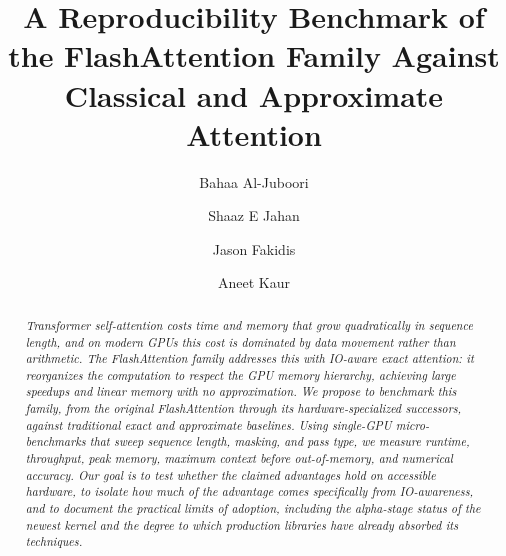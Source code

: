 \documentclass[sigconf,nonacm]{acmart}
\begin{document}
\title{A Reproducibility Benchmark of the FlashAttention Family Against Classical and Approximate Attention}

\author{Bahaa Al-Juboori}

\author{Shaaz E Jahan}

\author{Jason Fakidis}

\author{Aneet Kaur}

\renewcommand{\shortauthors}{Al-Juboori, Jahan, Fakidis, Kaur}

\begin{abstract}
\itshape
Transformer self-attention costs time and memory that grow quadratically in
sequence length, and on modern GPUs this cost is dominated by data movement
rather than arithmetic. The FlashAttention family addresses this with IO-aware
exact attention: it reorganizes the computation to respect the GPU memory
hierarchy, achieving large speedups and linear memory with no approximation. We
propose to benchmark this family, from the original FlashAttention through its
hardware-specialized successors, against traditional exact and approximate
baselines. Using single-GPU micro-benchmarks that sweep sequence length, masking,
and pass type, we measure runtime, throughput, peak memory, maximum context
before out-of-memory, and numerical accuracy. Our goal is to test whether the
claimed advantages hold on accessible hardware, to isolate how much of the
advantage comes specifically from IO-awareness, and to document the practical
limits of adoption, including the alpha-stage status of the newest kernel and the
degree to which production libraries have already absorbed its techniques.
\end{abstract}


\maketitle

\end{document}
